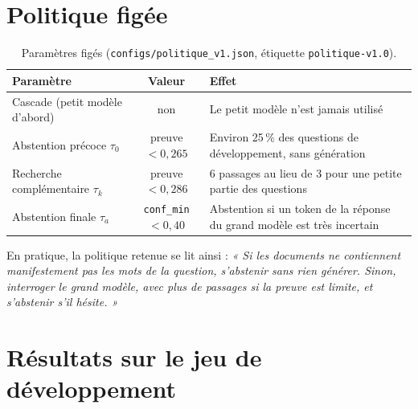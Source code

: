 \documentclass[11pt,a4paper]{article}
\begin{document}
\section{Politique figée}\label{sec:figee}

\begin{table}[H]
\centering\small
\begin{tabularx}{\textwidth}{l c Y}
\toprule
\textbf{Paramètre} & \textbf{Valeur} & \textbf{Effet} \\
\midrule
Cascade (petit modèle d'abord) & non & Le petit modèle n'est jamais utilisé \\
Abstention précoce $\tau_0$ & preuve $< 0{,}265$ & Environ 25\,\% des questions de développement, sans génération \\
Recherche complémentaire $\tau_k$ & preuve $< 0{,}286$ & 6 passages au lieu de 3 pour une petite partie des questions \\
Abstention finale $\tau_a$ & \texttt{conf\_min} $< 0{,}40$ & Abstention si un token de la réponse du grand modèle est très incertain \\
\bottomrule
\end{tabularx}
\caption{Paramètres figés (\texttt{configs/politique\_v1.json}, étiquette \texttt{politique-v1.0}).}
\label{tab:parametres}
\end{table}

En pratique, la politique retenue se lit ainsi : \emph{« Si les documents ne contiennent manifestement
pas les mots de la question, s'abstenir sans rien générer. Sinon, interroger le grand modèle, avec plus
de passages si la preuve est limite, et s'abstenir s'il hésite. »}

\section{Résultats sur le jeu de développement}\label{sec:resultats}
\end{document}
